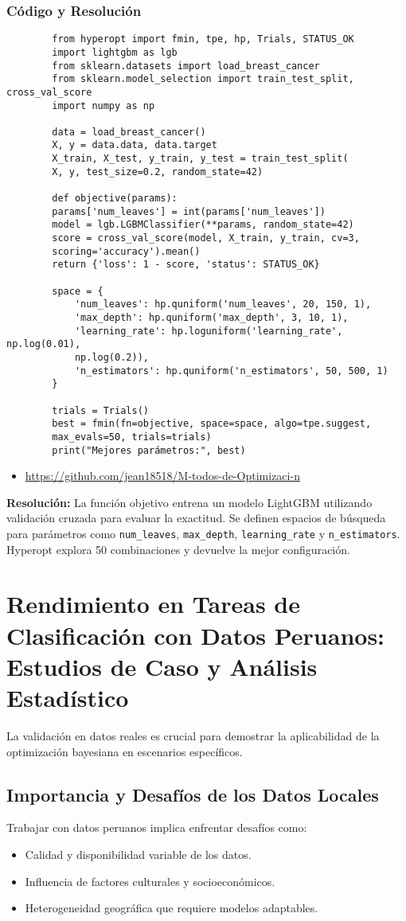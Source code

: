 \documentclass[12pt]{article}
\begin{document}
	\subsubsection*{Código y Resolución}
	\begin{verbatim}
		from hyperopt import fmin, tpe, hp, Trials, STATUS_OK
		import lightgbm as lgb
		from sklearn.datasets import load_breast_cancer
		from sklearn.model_selection import train_test_split, cross_val_score
		import numpy as np
		
		data = load_breast_cancer()
		X, y = data.data, data.target
		X_train, X_test, y_train, y_test = train_test_split(
		X, y, test_size=0.2, random_state=42)
		
		def objective(params):
		params['num_leaves'] = int(params['num_leaves'])
		model = lgb.LGBMClassifier(**params, random_state=42)
		score = cross_val_score(model, X_train, y_train, cv=3,
		scoring='accuracy').mean()
		return {'loss': 1 - score, 'status': STATUS_OK}
		
		space = {
			'num_leaves': hp.quniform('num_leaves', 20, 150, 1),
			'max_depth': hp.quniform('max_depth', 3, 10, 1),
			'learning_rate': hp.loguniform('learning_rate', np.log(0.01),
			np.log(0.2)),
			'n_estimators': hp.quniform('n_estimators', 50, 500, 1)
		}
		
		trials = Trials()
		best = fmin(fn=objective, space=space, algo=tpe.suggest, 
		max_evals=50, trials=trials)
		print("Mejores parámetros:", best)
	\end{verbatim}
	\begin{itemize}
		\item \url{https://github.com/jean18518/M-todos-de-Optimizaci-n}
	\end{itemize}
	\textbf{Resolución:} La función objetivo entrena un modelo LightGBM utilizando validación cruzada para evaluar la exactitud. Se definen espacios de búsqueda para parámetros como \texttt{num\_leaves}, \texttt{max\_depth}, \texttt{learning\_rate} y \texttt{n\_estimators}. Hyperopt explora 50 combinaciones y devuelve la mejor configuración.
	
	\section{Rendimiento en Tareas de Clasificación con Datos Peruanos: Estudios de Caso y Análisis Estadístico}
	La validación en datos reales es crucial para demostrar la aplicabilidad de la optimización bayesiana en escenarios específicos.
	
	\subsection{Importancia y Desafíos de los Datos Locales}
	Trabajar con datos peruanos implica enfrentar desafíos como:
	\begin{itemize}[leftmargin=1.5cm]
		\item Calidad y disponibilidad variable de los datos.
		\item Influencia de factores culturales y socioeconómicos.
		\item Heterogeneidad geográfica que requiere modelos adaptables.
	\end{itemize}
	\lipsum[21]
	
\end{document}
